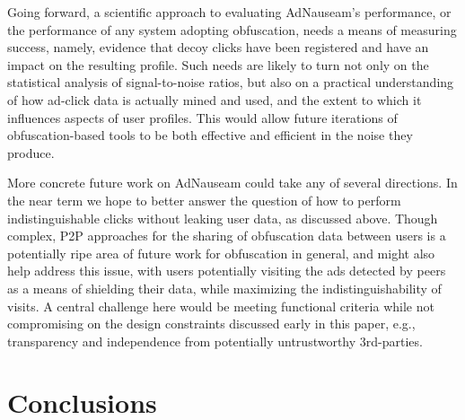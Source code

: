 \documentclass[conference]{IEEEtran}
\begin{document}
Going forward, a scientific approach to evaluating AdNauseam's performance, or the performance of any system adopting obfuscation, needs a means of measuring success, namely, evidence that decoy clicks have been registered and have an impact on the resulting profile. Such needs are likely to turn not only on the statistical analysis of signal-to-noise ratios, but also on a practical understanding of how ad-click data is actually mined and used, and the extent to which it influences aspects of user profiles. This would allow future iterations of obfuscation-based tools to be both effective and efficient in the noise they produce.

More concrete future work on AdNauseam could take any of several directions. In the near term we hope to better answer the question of how to perform indistinguishable clicks without leaking user data, as discussed above. Though complex, P2P approaches for the sharing of obfuscation data between users is a potentially ripe area of future work for obfuscation in general, and might also help address this issue, with users potentially visiting the ads detected by peers as a means of shielding their data, while maximizing the indistinguishability of visits. A central challenge here would be meeting functional criteria while not compromising on the design constraints discussed early in this paper, e.g., transparency and independence from potentially untrustworthy 3rd-parties.

\section{Conclusions}
\end{document}
